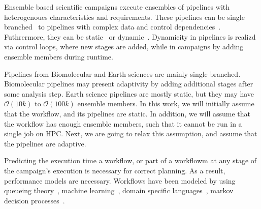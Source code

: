 %
%

Ensemble based scientific campaigns execute ensembles of pipelines with 
heterogenoues characteristics and requirements. These pipelines can be single 
branched~\cite{paraskevakos2019workflow,dakka2018high,ramakrishnan_survey,
balasubramanian2018harnessing} to pipelines with complex data and control 
dependencies~\cite{ramakrishnan_survey,deelman2018future}. Futhrermore, they 
can be static~\cite{paraskevakos2019workflow} or dynamic~\cite{dakka2018high,
balasubramanian2018harnessing}. Dynamicity in pipelines is realizd via control 
loops, where new stages are added, while in campaigns by adding ensemble 
members during runtime.

Pipelines from Biomolecular and Earth sciences are mainly single branched. 
Biomolecular pipelines may present adaptivity by adding additional stages after 
some analysis step. Earth science pipelines are mostly static, but they may 
have $\mathcal{O}(10k)$ to $\mathcal{O}(100k)$ ensemble members. In this work, 
we will initially assume that the workflow, and its pipelines are static. In 
addition, we will assume that the workflow has enough ensemble members, such 
that it cannot be run in a single job on HPC. Next, we are going to relax this 
assumption, and assume that the pipelines are adaptive.


Predicting the execution time a workflow, or part of a workflowm at any stage 
of the campaign's execution is necessary for correct planning. As a result, 
performance models are necessary. Workflows have been modeled by using queueing 
theory~\cite{bao2019performance,yao2019throughput}, machine learning~\cite
{witt2019predictive,pumma2017runtime}, domain specific languages~\cite
{deelman2017performance,mandal2016toward}, markov decision processes~\cite
{jia2005cost}.

